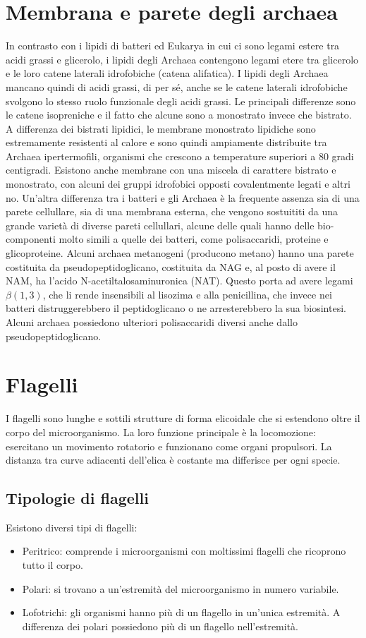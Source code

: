 \section{Membrana e parete degli archaea}
In contrasto con i lipidi di batteri ed Eukarya in cui ci sono legami estere tra acidi grassi e glicerolo, i lipidi degli Archaea contengono legami etere 
tra glicerolo e le loro catene laterali idrofobiche (catena alifatica). I lipidi degli Archaea mancano quindi di acidi grassi, di per sé, anche se le catene 
laterali idrofobiche svolgono lo stesso ruolo funzionale degli acidi grassi. 
Le principali differenze sono le catene isopreniche e il fatto che alcune sono 
a monostrato invece che bistrato. A differenza dei bistrati lipidici, le membrane monostrato lipidiche sono estremamente resistenti al calore e sono quindi 
ampiamente distribuite tra Archaea ipertermofili, organismi che crescono a temperature superiori a 80 gradi centigradi. Esistono anche membrane con una 
miscela di carattere bistrato e monostrato, con alcuni dei gruppi idrofobici opposti covalentmente legati e altri no. Un’altra differenza tra i batteri e 
gli Archaea è la frequente assenza sia di una parete cellullare, sia di una membrana esterna, che vengono sostuititi da una grande varietà di diverse pareti 
cellullari, alcune delle quali hanno delle bio-componenti molto simili a quelle dei batteri, come polisaccaridi, proteine e glicoproteine. Alcuni archaea 
metanogeni (producono metano) hanno una parete costituita da pseudopeptidoglicano, costituita da NAG e, al posto di avere il NAM, ha 
l’acido N-acetiltalosaminuronica (NAT). Questo porta ad avere legami $\beta(1, 3)$, che li rende insensibili al lisozima e 
alla penicillina, che invece nei batteri distruggerebbero il peptidoglicano o ne arresterebbero la sua biosintesi. Alcuni archaea possiedono ulteriori polisaccaridi diversi anche dallo 
pseudopeptidoglicano.

\section{Flagelli}
I flagelli sono lunghe e sottili strutture di forma elicoidale che si estendono oltre il corpo del microorganismo.
La loro funzione principale \`e la locomozione: esercitano un movimento rotatorio e funzionano come organi propulsori.
La distanza tra curve adiacenti dell'elica \`e costante ma differisce per ogni specie.
	
	\subsection{Tipologie di flagelli}
	Esistono diversi tipi di flagelli:
	\begin{itemize}
		\item Peritrico: comprende i microorganismi con moltissimi flagelli che ricoprono tutto il corpo.
		\item Polari: si trovano a un'estremit\`a del microorganismo in numero variabile.
		\item Lofotrichi: gli organismi hanno pi\`u di un flagello in un'unica estremit\`a.
			A differenza dei polari possiedono pi\`u di un flagello nell'estremit\`a.
	\end{itemize}

